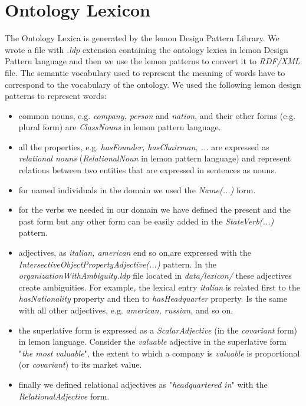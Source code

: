 \section{Ontology Lexicon}
\label{sec:ontology-lexicon}


The Ontology Lexica is generated by the lemon Design Pattern Library. We wrote a file with \textit{.ldp} extension containing the ontology lexica in lemon Design Pattern language and then we use the lemon patterns to convert it to \textit{RDF/XML} file. 
The semantic vocabulary used to represent the meaning of words have to correspond to the vocabulary of the ontology. We used the following lemon design patterns to represent words:
\begin{itemize}
\item common nouns, e.g. \textit{company, person} and \textit{nation}, and their other forms (e.g. plural form) are \textit{ClassNouns} in lemon pattern language.
\item all the properties, e.g. \textit{hasFounder, hasChairman, ...} are expressed as \textit{relational nouns} (\textit{RelationalNoun} in lemon pattern language) and represent relations between two entities that are expressed in sentences as nouns.
\item for named individuals in the domain we used the \textit{Name(...)} form.
\item for the verbs we needed in our domain we have defined the present and the past form but any other form can be easily added in the \textit{StateVerb(...)} pattern.
\item adjectives, as \textit{italian, american} end so on,are expressed with the \textit{IntersectiveObjectPropertyAdjective(...)} pattern. In the \textit{organizationWithAmbiguity.ldp} file located in \textit{data/lexicon/} these adjectives create ambiguities. For example, the lexical entry \textit{italian} is related first to the \textit{hasNationality} property and then to \textit{hasHeadquarter} property. Is the same with all other adjectives, e.g. \textit{american, russian,} and so on. 
\item the superlative form is expressed as a \textit{ScalarAdjective} (in the \textit{covariant} form) in lemon language. Consider the \textit{valuable} adjective in the superlative form "\textit{the most valuable}", the extent to which a company is \textit{valuable} is proportional (or \textit{covariant}) to its market value.
\item finally we defined relational adjectives as "\textit{headquartered in}" with the \textit{RelationalAdjective} form.
\end{itemize}

